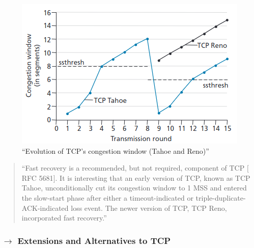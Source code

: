 \begin{figure}[ht]
    \centering
    \includegraphics[width = 0.65\linewidth]{img/3/reno-tahoe.png}
    \caption{``Evolution of TCP’s congestion window (Tahoe and Reno)''\cite{Kurose2017}}
    \label{fig:tahoe-reno}
\end{figure}

\vspace{-1em}
\begin{quote}
    ``Fast recovery is a recommended, but not required, component of TCP $[$RFC 5681$]$. It is interesting that an early version of TCP, known as TCP Tahoe, unconditionally cut its congestion window to 1 MSS and entered the slow-start phase after either a timeout-indicated or triple-duplicate-ACK-indicated loss event. The newer version of TCP, TCP Reno, incorporated fast recovery.''\cite{Kurose2017}
\end{quote}

\newpage
\subsubsection[3.6.4 Extensions and Alternatives to TCP]{$\rightarrow$ Extensions and Alternatives to TCP}

